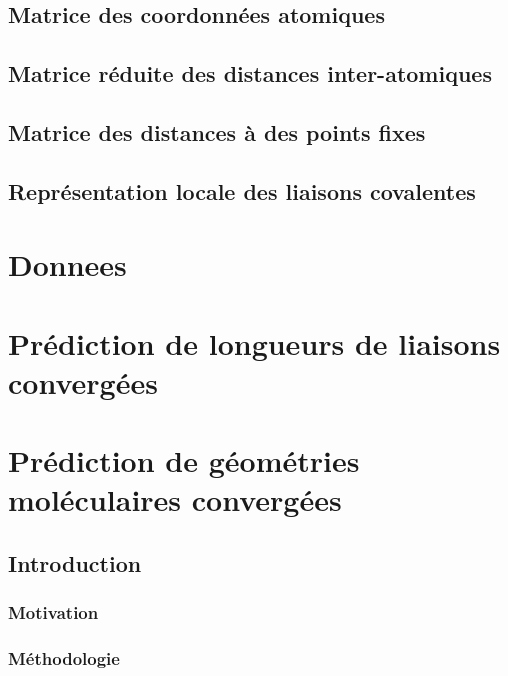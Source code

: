 \documentclass{report}
\begin{document}
	\section{Matrice des coordonnées atomiques}
		

	\section{Matrice réduite des distances inter-atomiques}
		
		
	\section{Matrice des distances à des points fixes}
		
		
	\section{Représentation locale des liaisons covalentes}
		

\chapter{Donnees}

\chapter{Prédiction de longueurs de liaisons convergées}

\chapter{Prédiction de géométries moléculaires convergées}

	\section{Introduction}
		\subsection{Motivation}
			
		\subsection{Méthodologie}
			
\end{document}
